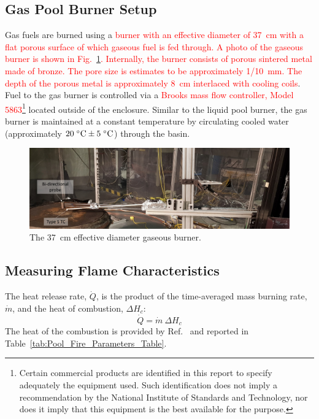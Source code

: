 \documentclass[12pt]{article}
\begin{document}
\subsection{Gas Pool Burner Setup}
\label{ssec:Gas_Pool_Burner_Setup}
Gas fuels are burned using a \textcolor{red}{burner with an effective diameter of 37~cm with a flat porous surface of which gaseous fuel is fed through. A photo of the gaseous burner is shown in Fig.~\ref{fig:Gas_Pool_Burner}. Internally, the burner consists of porous sintered metal made of bronze. The pore size is estimates to be approximately 1/10~mm. The depth of the porous metal is approximately 8~cm interlaced with cooling coils}. Fuel to the gas burner is controlled via a \textcolor{red}{Brooks mass flow controller, Model 5863}\footnote{\label{fn:product} Certain commercial products are identified in this report to specify adequately the equipment used. Such identification does not imply a recommendation by the National Institute of Standards and Technology, nor does it imply that this equipment is the best available for the purpose.} located outside of the enclosure. Similar to the liquid pool burner, the gas burner is maintained at a constant temperature by circulating cooled water (approximately $20 \; ^\circ \hbox{C} \pm 5 \; ^\circ \hbox{C}$) through the basin.

\begin{figure}[h!]
	\centering
\includegraphics[width=\textwidth,keepaspectratio]{Gas_Burner_2.jpg}
	\caption[Photograph of the gaseous burner]{The 37~cm effective diameter gaseous burner.}
	\label{fig:Gas_Pool_Burner}
\end{figure}

\subsection{Measuring Flame Characteristics}
\label{ssec:Flame_Characteristics_Measurements}

The heat release rate, $\dot{Q}$, is the product of the time-averaged mass burning rate, $\dot{m}$, and the heat of combustion, $\Delta H_{c}$:
\begin{equation}\label{eq:Heat_release_rate}
\dot{Q}= \dot{m}~\Delta H_{c}
\end{equation}
The heat of the combustion is provided by Ref.~\cite{Dippr} and reported in Table~\ref{tab:Pool_Fire_Parameters_Table}.
\end{document}
